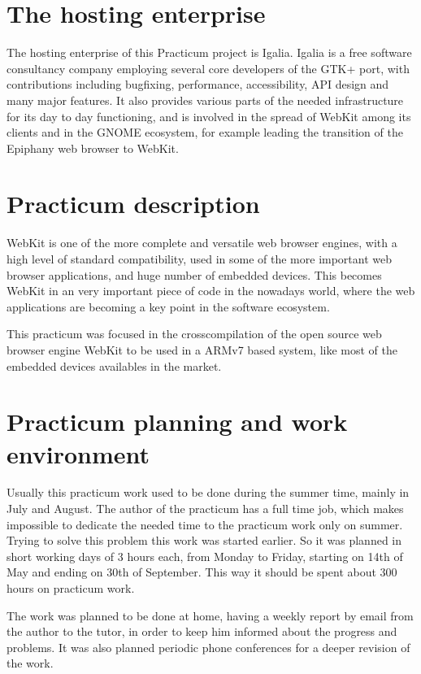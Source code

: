 \documentclass[a4paper,11pt,openany]{report}
\begin{document}
\section{The hosting enterprise}
The hosting enterprise of this Practicum project is Igalia\cite{igalia}. Igalia is a free software consultancy company employing several core developers of the GTK+ port, with contributions including bugfixing, performance, accessibility, API design and many major features. It also provides various parts of the needed infrastructure for its day to day functioning, and is involved in the spread of WebKit among its clients and in the GNOME ecosystem, for example leading the transition of the Epiphany web browser to WebKit. 

\section{Practicum description}
WebKit is one of the more complete and versatile web browser engines, with a high level of standard compatibility, used in some of the more important web browser applications, and huge number of embedded devices. This becomes WebKit in an very important piece of code in the nowadays world, where the web applications are becoming a key point in the software ecosystem.

This practicum was focused in the crosscompilation of the open source web browser engine WebKit to be used in a ARMv7 based system, like most of the embedded devices availables in the market. 

\section{Practicum planning and work environment}
Usually this practicum work used to be done during the summer time, mainly in July and August. The author of the practicum has a full time job, which makes impossible to dedicate the needed time to the practicum work only on summer. Trying to solve this problem this work was started earlier. So it was planned in short working days of 3 hours each, from Monday to Friday, starting on 14th of May and ending on 30th of September. This way it should be spent about 300 hours on practicum work.

The work was planned to be done at home, having a weekly report by email from the author to the tutor, in order to keep him informed about the progress and problems. It was also planned periodic phone conferences for a deeper revision of the work.
\end{document}
